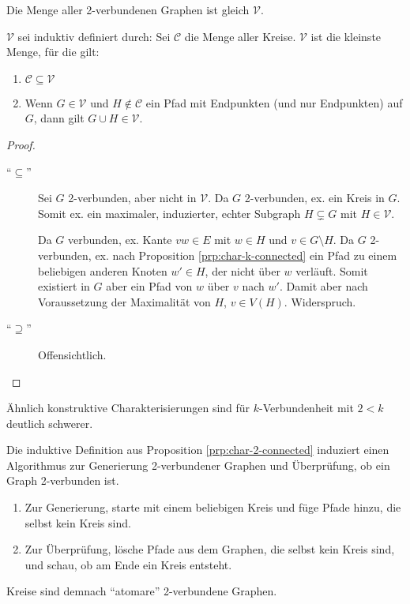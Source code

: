 \begin{proposition}
    \label{prp:char-2-connected}
    Die Menge aller 2-verbundenen Graphen ist gleich $ \mathcal{V} $.

    $ \mathcal{V} $ sei induktiv definiert durch:
    Sei $ \mathcal{C} $ die Menge aller Kreise.
    $ \mathcal{V} $ ist die kleinste Menge, für die gilt:
    \begin{enumerate}
        \item $ \mathcal{C} \subseteq \mathcal{V} $
        \item Wenn $ G \in \mathcal{V} $ und $ H \notin \mathcal{C} $ ein Pfad mit Endpunkten (und nur Endpunkten) auf $ G $, dann gilt $ G \cup H \in \mathcal{V} $.
    \end{enumerate}
\end{proposition}

\begin{proof}~\par
    \begin{description}
        \item[``$ \subseteq $''] Sei $ G $ 2-verbunden, aber nicht in $ \mathcal{V} $.
        Da $ G $ 2-verbunden, ex. ein Kreis in $ G $.
        Somit ex. ein maximaler, induzierter, echter Subgraph $ H \subsetneq G $ mit $ H \in \mathcal{V} $.

        Da $ G $ verbunden, ex. Kante $ vw \in E $ mit $ w \in H $ und $ v \in G \setminus H $.
        Da $ G $ 2-verbunden, ex. nach Proposition \ref{prp:char-k-connected} ein Pfad zu einem beliebigen anderen Knoten $ w' \in H $, der nicht über $ w $ verläuft.
        Somit existiert in $ G $ aber ein Pfad von $ w $ über $ v $ nach $ w' $.
        Damit aber nach Voraussetzung der Maximalität von $ H $, $ v \in V(H) $.
        Widerspruch.
        \item[``$ \supseteq $''] Offensichtlich.
    \end{description}
\end{proof}

\begin{remark}
    Ähnlich konstruktive Charakterisierungen sind für $ k $-Verbundenheit mit $ 2 < k $ deutlich schwerer.
\end{remark}

\begin{observation}
    Die induktive Definition aus Proposition \ref{prp:char-2-connected} induziert einen Algorithmus zur Generierung 2-verbundener Graphen und Überprüfung, ob ein Graph 2-verbunden ist.
    \begin{enumerate}
        \item Zur Generierung, starte mit einem beliebigen Kreis und füge Pfade hinzu, die selbst kein Kreis sind.
        \item Zur Überprüfung, lösche Pfade aus dem Graphen, die selbst kein Kreis sind, und schau, ob am Ende ein Kreis entsteht.
    \end{enumerate}

    Kreise sind demnach ``atomare'' 2-verbundene Graphen.
\end{observation}

